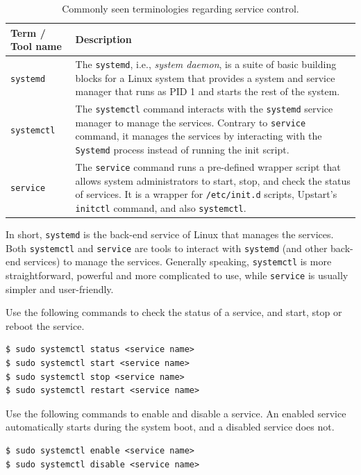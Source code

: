 \begin{table}
	\centering \caption{Commonly seen terminologies regarding service control.}\label{ch:sa:tab:servicecontroltools}
	\begin{tabularx}{\textwidth}{lX}
		\hline
		Term / Tool name & Description \\ \hline
		\verb|systemd| & The \verb|systemd|, i.e., \textit{system daemon}, is a suite of basic building blocks for a Linux system that provides a system and service manager that runs as PID 1 and starts the rest of the system.  \\ \hline
		\verb|systemctl| & The \verb|systemctl| command interacts with the \verb|systemd| service manager to manage the services. Contrary to \verb|service| command, it manages the services by interacting with the \verb|Systemd| process instead of running the init script.  \\ \hline
		\verb|service| & The \verb|service| command runs a pre-defined wrapper script that allows system administrators to start, stop, and check the status of services. It is a wrapper for \verb|/etc/init.d| scripts, Upstart's \verb|initctl| command, and also \verb|systemctl|. \\ \hline
	\end{tabularx}
\end{table}

In short, \verb|systemd| is the back-end service of Linux that manages the services. Both \verb|systemctl| and \verb|service| are tools to interact with \verb|systemd| (and other back-end services) to manage the services. Generally speaking, \verb|systemctl| is more straightforward, powerful and more complicated to use, while \verb|service| is usually simpler and user-friendly.

Use the following commands to check the status of a service, and start, stop or reboot the service.
\begin{lstlisting}
$ sudo systemctl status <service name>
$ sudo systemctl start <service name>
$ sudo systemctl stop <service name>
$ sudo systemctl restart <service name>
\end{lstlisting}

Use the following commands to enable and disable a service. An enabled service automatically starts during the system boot, and a disabled service does not.
\begin{lstlisting}
$ sudo systemctl enable <service name>
$ sudo systemctl disable <service name>
\end{lstlisting}

